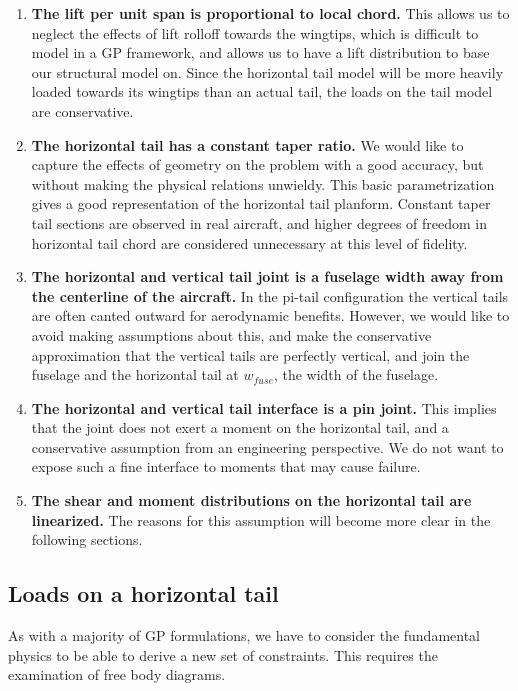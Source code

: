 \begin{enumerate}
    \item \textbf{The lift per unit span is proportional to local chord.} This allows 
    us to neglect the effects of lift rolloff towards the wingtips, which is difficult
    to model in a \gls{GP} framework, and allows us to have a lift distribution to base
    our structural model on.  Since the horizontal tail model will
    be more heavily loaded towards its wingtips than an actual tail, the loads
    on the tail model are conservative. 
    \item \textbf{The horizontal tail has a constant taper ratio.} We would like to 
    capture the effects of geometry on the problem with a good 
    accuracy, but without making the physical relations unwieldy.
    This basic parametrization
    gives a good representation of the horizontal tail planform.  
    Constant taper tail sections are observed in real aircraft, and
    higher degrees of freedom in horizontal tail chord are considered unnecessary
    at this level of fidelity.
    \item \textbf{The horizontal and vertical tail joint is a fuselage width away from 
    the centerline of the aircraft.} In the pi-tail configuration the vertical tails are 
    often canted outward for aerodynamic benefits. However, we would like to avoid making 
    assumptions about this, and make the conservative approximation that the vertical tails
    are perfectly vertical, and join the fuselage and the horizontal tail at $w_{fuse}$, the
    width of the fuselage.
    \item \textbf{The horizontal and vertical tail interface is a pin joint.} This implies 
    that the joint does not exert a moment on the horizontal tail, and a conservative 
    assumption from an engineering perspective. We do not want to expose such a fine 
    interface to moments that may cause failure. \label{item:pinjoint}
    \item \textbf{The shear and moment distributions on the horizontal tail are 
    linearized.} The reasons for this assumption will become more clear in 
    the following sections. 
\end{enumerate}

\subsection{Loads on a horizontal tail}
\label{s:HTloads}

As with a majority of \gls{GP} formulations, we have to consider the fundamental physics to 
be able to derive a new set of constraints. This requires the examination of free body
diagrams.

